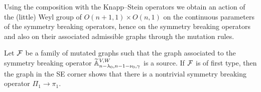 \begin{lemma}
\end{lemma}


\medskip

\medskip

Using the composition with the Knapp--Stein operators
 we obtain an action
 of the (little) Weyl group of $O(n+1,1) \times O(n,1)$
 on the continuous parameters of the symmetry breaking operators,
 hence on the symmetry breaking operators
 and also on their associated admissible graphs through the mutation rules. 



\begin{example}
Let $\cal F$ be a family of mutated graphs
 such that the graph associated to the symmetry breaking operator 
 ${\widetilde{\mathbb{A}}}_{{n-\lambda_0},{n-1-\nu_0},{\gamma}}^{{V,W}}$
 is a source. 
If $\cal F$ is of first type,
 then the graph in the SE corner shows that there is a nontrivial symmetry breaking operator $\Pi_1 \rightarrow \pi_1$.
\end{example}
 
